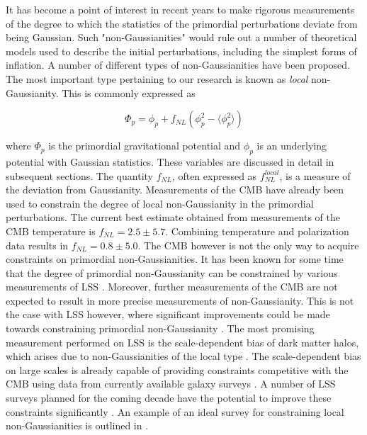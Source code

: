 \documentclass[10pt,letterpaper,final]{iopart}
\numberwithin{equation}{subsection}
\def\ni{\noindent}
\begin{document}
It has become a point of interest in recent years to make rigorous measurements of the degree to which the statistics of the primordial perturbations deviate from being Gaussian. Such "non-Gaussianities" would rule out a number of theoretical models used to describe the initial perturbations, including the simplest forms of inflation. A number of different types of non-Gaussianities have been proposed. The most important type pertaining to our research is known as \emph{local} non-Gaussianity. This is commonly expressed as \cite{Dalal}\cite{NG1}\cite{NG2}\cite{NG3}\cite{NG4}\cite{NG5}\cite{NG6}

\begin{equation}
\Phi_p = \phi_p + f_{NL}\left(\phi_p^2 - \langle \phi_p^2 \rangle \right)
\end{equation}

\ni where $\Phi_p$ is the primordial gravitational potential and $\phi_p$ is an underlying potential with Gaussian statistics. These variables are discussed in detail in subsequent sections. The quantity $f_{NL}$, often expressed as $f_{NL}^{local}$, is a measure of the deviation from Gaussianity. Measurements of the CMB have already been used to constrain the degree of local non-Gaussianity in the primordial perturbations\cite{NG6}\cite{LSSSurveys}\cite{PlanckNG2013}\cite{PlanckNG}. The current best estimate \cite{PlanckNG} obtained from measurements of the CMB temperature is $f_{NL} = 2.5 \pm 5.7$. Combining temperature and polarization data results in $f_{NL} = 0.8 \pm 5.0$. The CMB however is not the only way to acquire constraints on primordial non-Gaussianities. It has been known for some time that the degree of primordial non-Gaussianity can be constrained by various measurements of LSS \cite{Dalal}\cite{LSSSurveys}\cite{NG1}\cite{NG2}\cite{NG3}\cite{NG4}\cite{NG5}\cite{NG6}. Moreover, further measurements of the CMB are not expected to result in more precise measurements of non-Gaussianity. This is not the case with LSS however, where significant improvements could be made towards constraining primordial non-Gaussianity \cite{LSSSurveys}.  The most promising measurement performed on LSS is the scale-dependent bias of dark matter halos, which arises due to non-Gaussianities of the local type \cite{Dalal}. The scale-dependent bias on large scales is already capable of providing constraints competitive with the CMB using data from currently available galaxy surveys \cite{LSSSurveys}. A number of LSS surveys planned for the coming decade have the potential to improve these constraints significantly \cite{LSSSurveys}\cite{DES}\cite{LSST}\cite{DESI}\cite{Euclid}. An example of an ideal survey for constraining local non-Gaussianities is outlined in \cite{LSSSurveys}. 
\end{document}

